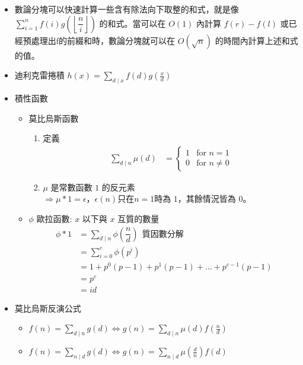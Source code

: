 
\begin{itemize}
\item 數論分塊可以快速計算一些含有除法向下取整的和式，就是像 $\sum_{i = 1} ^ {n} f(i) g(\left\lfloor\dfrac ni\right\rfloor)$ 的和式。當可以在 $O(1)$ 內計算 $f(r) - f(l)$ 或已經預處理出f的前綴和時，數論分塊就可以在 $O(\sqrt n)$ 的時間內計算上述和式的值。
\item 迪利克雷捲積 $h(x) = \sum_{d \mid x} f(d) g(\frac{x}{d})$
\item 積性函數
    \begin{itemize}
        \item 莫比烏斯函數
            \begin{enumerate}
                \item 定義
                $$ \begin{aligned}
                    \sum_{d \mid n} \mu (d)
                    &=
                    \begin{cases}
                        1 & \text{for } n = 1\\
                        0 & \text{for } n \neq 0
                    \end{cases}
                \end{aligned} $$

                \item $\mu$ 是常數函數 $1$ 的反元素\\
                $\Rightarrow \mu \ast 1 = \epsilon$，$\epsilon (n) \text{只在} n = 1 \text{時為 1，其餘情況皆為 0。}$
            \end{enumerate}

        \item $\phi$ 歐拉函數: $x$ 以下與 $x$ 互質的數量
        $$ \begin{aligned}
            \phi \ast 1
            &= \sum_{d \mid n} \phi(\dfrac {n}{d}) \ \ \text{質因數分解}\\
            &= \sum_{i = 0} ^ {c} \phi(p ^ i)\\
            &= 1 + p^0(p-1) + p^1(p-1) + ... + p^{c-1}(p-1)\\
            &= p^c\\
            &= id
        \end{aligned} $$
    \end{itemize}

\item 莫比烏斯反演公式
    \begin{itemize}
        \item $f(n)=\sum_{d\mid n}g(d)\Leftrightarrow g(n)=\sum_{d\mid n}\mu(d)f(\frac{n}{d})$
        \item $f(n)=\sum_{n\mid d}g(d)\Leftrightarrow g(n)=\sum_{n\mid d}\mu(\frac{d}{n})f(d)$
    \end{itemize}


\end{itemize}
